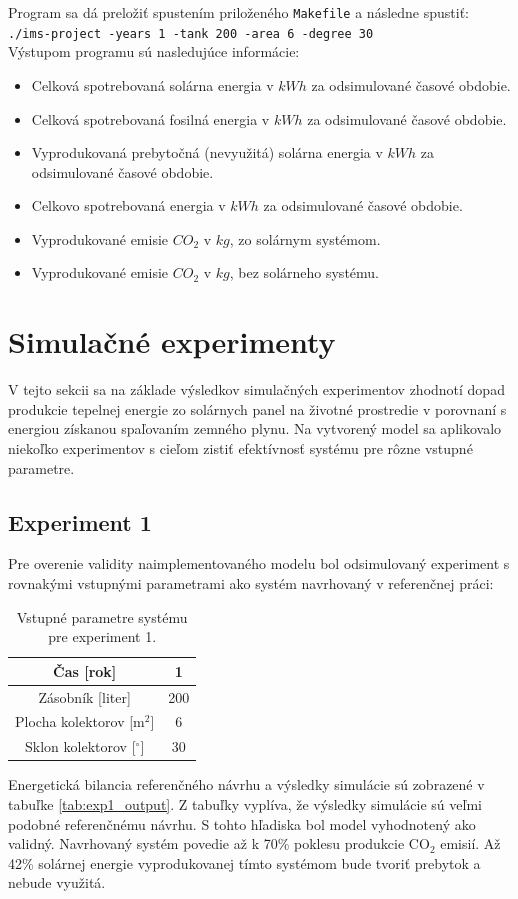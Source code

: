 \documentclass[a4paper, 11pt]{article}
\begin{document}
Program sa dá preložiť spustením priloženého \texttt{Makefile} a následne spustiť:\\
\texttt{./ims-project -years 1 -tank 200 -area 6 -degree 30} \\
Výstupom programu sú nasledujúce informácie:
\begin{itemize}
	\item Celková spotrebovaná solárna energia v $kWh$ za odsimulované časové obdobie.
	\item Celková spotrebovaná fosilná energia v $kWh$ za odsimulované časové obdobie.
	\item Vyprodukovaná prebytočná (nevyužitá) solárna energia v $kWh$ za odsimulované časové obdobie.
	\item Celkovo spotrebovaná energia v $kWh$ za odsimulované časové obdobie.
	\item Vyprodukované emisie $CO_2$ v $kg$, zo solárnym systémom.
	\item Vyprodukované emisie $CO_2$ v $kg$, bez solárneho systému.
\end{itemize}

\section{Simulačné experimenty}
V tejto sekcii sa na základe výsledkov simulačných experimentov zhodnotí dopad produkcie tepelnej energie zo solárnych panel na životné prostredie v porovnaní s energiou získanou spaľovaním zemného plynu. Na vytvorený model sa aplikovalo niekoľko experimentov s cieľom zistiť efektívnosť systému pre rôzne vstupné parametre.

\subsection{Experiment 1}
Pre overenie validity naimplementovaného modelu bol odsimulovaný experiment s rovnakými vstupnými parametrami ako systém navrhovaný v referenčnej práci\cite{bc_solar_system}:

\begin{table}[H]
	\centering
	\begin{tabular}{|c|c|}
		\hline
		Čas {[}rok{]} & 1 \\ \hline
		Zásobník {[}liter{]} & 200 \\ \hline
		Plocha kolektorov {[}m$^2${]} & 6 \\ \hline
		Sklon kolektorov {[}$^{\circ}${]} & 30 \\ \hline
	\end{tabular}
	\caption{Vstupné parametre systému pre experiment 1.}
	\label{tab:exp1_input}
\end{table}
Energetická bilancia referenčného návrhu\cite{bc_solar_system} a výsledky simulácie sú zobrazené v tabuľke \ref{tab:exp1_output}. Z tabuľky vyplíva, že výsledky simulácie sú veľmi podobné referenčnému návrhu. S tohto hľadiska bol model vyhodnotený ako validný. Navrhovaný systém povedie až k 70\% poklesu produkcie CO$_2$ emisií. Až 42\% solárnej energie vyprodukovanej tímto systémom bude tvoriť prebytok a nebude využitá.
\end{document}
